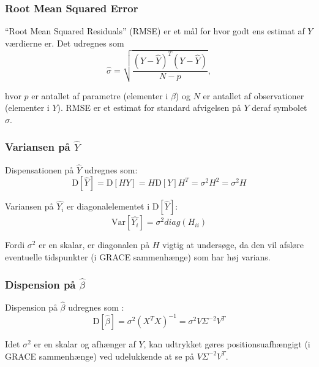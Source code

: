 \subsubsection{Root Mean Squared Error}

``Root Mean Squared Residuals'' (RMSE) er et mål for hvor godt ens estimat af $Y$ værdierne er.
Det udregnes som
\begin{equation}
\hat{\sigma} = \sqrt{\frac{\left(Y - \hat{Y}\right)^T \left(Y - \hat{Y}\right)}{N-p}},
\end{equation}

hvor $p$ er antallet af parametre (elementer i $\beta$) og $N$ er antallet af observationer (elementer i $Y$).
RMSE er et estimat for standard afvigelsen på $Y$ \cite[theorem~3.4]{time-series-analysis} deraf symbolet $\hat{\sigma}$.

\subsubsection{Variansen på $\hat{Y}$}

Dispensationen på $\hat{Y}$ udregnes som:
\begin{equation}
\mathrm{D}[\hat{Y}] = \mathrm{D}[H Y] = H \mathrm{D}[Y] H^T = \sigma^2 H^2 = \sigma^2 H
\end{equation}

Variansen på $\hat{Y_i}$ er diagonalelementet i $\mathrm{D}[\hat{Y}]$:
\begin{equation}
\mathrm{Var}[\hat{Y_i}] = \sigma^2 diag(H_{ii})
\end{equation}

Fordi $\sigma^2$ er en skalar, er diagonalen på $H$ vigtig at undersøge, da den vil afsløre eventuelle tidspunkter (i GRACE sammenhænge) som har høj varians.

\subsubsection{Dispension på $\hat{\beta}$}

Dispension på $\hat{\beta}$ udregnes som \cite[theorem~3.2]{time-series-analysis}:
\begin{equation}
\mathrm{D}[\hat{\beta}] = \sigma^2 (X^T X)^{-1} = \sigma^2 V \Sigma^{-2} V^T
\end{equation}

Idet $\sigma^2$ er en skalar og afhænger af $Y$, kan udtrykket gøres positionsuafhængigt (i GRACE sammenhænge) ved udelukkende at se på $V \Sigma^{-2} V^T$.

